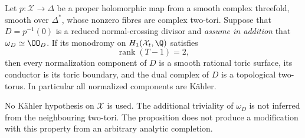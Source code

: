 \begin{proposition}\label{push:src:B.4.28}
Let $p:\mathcal X\to\Delta$ be a proper holomorphic map
from a smooth complex threefold, smooth over $\Delta^*$,
whose nonzero fibres are complex two-tori. Suppose that
$D=p^{-1}(0)$ is a reduced normal-crossing divisor and
\emph{assume in addition} that $\omega_D\simeq\OO_D$.
If its monodromy on $H_1(\mathcal X_t,\Q)$ satisfies
\[
 \operatorname{rank}(T-1)=2,                         \tag{B.4.28.1}
\]
then every normalization component of $D$ is a smooth
rational toric surface, its conductor is its toric
boundary, and the dual complex of $D$ is a topological
two-torus. In particular all normalized components are
K\"ahler.

No K\"ahler hypothesis on $\mathcal X$ is used. The
additional triviality of $\omega_D$ is not inferred from
the neighbouring two-tori. The proposition does not
produce a modification with this property from an
arbitrary analytic completion.
\end{proposition}
